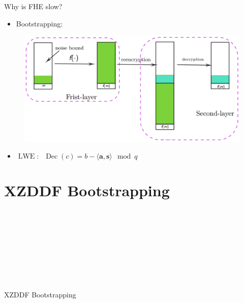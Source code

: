 \documentclass[aspectratio=169]{beamer}
\begin{document}
\begin{frame}{Why is FHE slow?}

    \begin{itemize}
        \item Bootstrapping:
    \end{itemize}

    \begin{figure}
        \centering
        \includegraphics[scale=0.2]{data/bootstrap.png}
        \label{fig:bootstrap}
    \end{figure}
    
    \begin{itemize}
        \item $\operatorname{LWE}: \;\; \operatorname{Dec}(c) = b - \langle \mathbf{a}, \mathbf{s} \rangle \mod q$ 
    \end{itemize}

\end{frame}



\section{XZDDF Bootstrapping}


\begin{frame}{\\~\\~\\~\\~\\~\\~\\~\\ \huge \text{\;\;\;\;\;\;\;} XZDDF Bootstrapping}
\end{frame}
\end{document}
